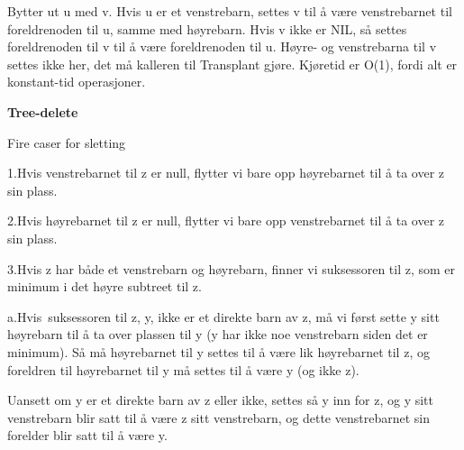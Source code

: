 \documentclass[12pt]{report}
\begin{document}
 \par

Bytter ut u med v. Hvis u er et venstrebarn, settes v til å være venstrebarnet til foreldrenoden til u, samme med høyrebarn. Hvis v ikke er NIL, så settes foreldrenoden til v til å være foreldrenoden til u. Høyre- og venstrebarna til v settes ikke her, det må kalleren til Transplant gjøre. Kjøretid er O(1), fordi alt er konstant-tid operasjoner. \par


\vspace{\baselineskip}

\vspace{\baselineskip}

\vspace{\baselineskip}

\vspace{\baselineskip}

\vspace{\baselineskip}
{\fontsize{14pt}{16.8pt}\selectfont \textbf{Tree-delete}\par}\par


\vspace{\baselineskip}
Fire caser for sletting\par

1.\tab Hvis venstrebarnet til z er null, flytter vi bare opp høyrebarnet til å ta over z sin plass.\par

2.\tab Hvis høyrebarnet til z er null, flytter vi bare opp venstrebarnet til å ta over z sin plass.\par

3.\tab Hvis z har både et venstrebarn og høyrebarn, finner vi suksessoren til z, som er minimum i det høyre subtreet til z. \par

a.\tab Hvis\ suksessoren til z, y,  ikke er et direkte barn av z, må vi først sette y sitt høyrebarn til å ta over plassen til y (y har ikke noe venstrebarn siden det er minimum). Så må høyrebarnet til y settes til å være lik høyrebarnet til z, og foreldren til høyrebarnet til y må settes til å være y (og ikke z). \par

Uansett om y er et direkte barn av z eller ikke, settes så y inn for z, og y sitt venstrebarn blir satt til å være z sitt venstrebarn, og dette venstrebarnet sin forelder blir satt til å være y.\par
\end{document}
